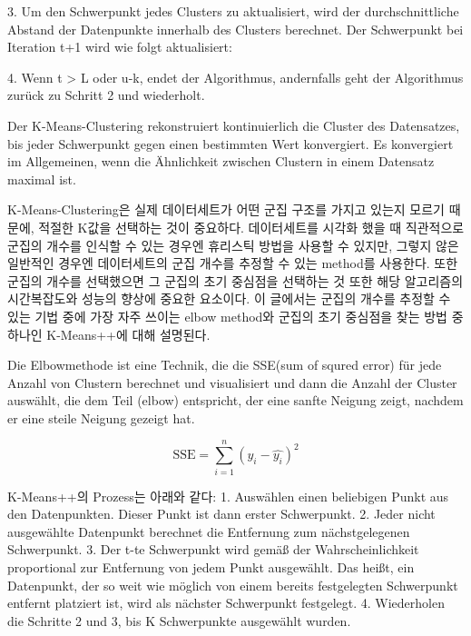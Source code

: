                     3. Um den Schwerpunkt jedes Clusters zu aktualisiert, wird der durchschnittliche Abstand der Datenpunkte innerhalb des Clusters berechnet. Der Schwerpunkt bei Iteration t+1 wird wie folgt aktualisiert:

                    4. Wenn t > L oder u-k, endet der Algorithmus, andernfalls geht der Algorithmus zurück zu Schritt 2 und wiederholt.
                

                Der K-Means-Clustering rekonstruiert kontinuierlich die Cluster des Datensatzes, bis jeder Schwerpunkt gegen einen bestimmten Wert konvergiert. Es konvergiert im Allgemeinen, wenn die Ähnlichkeit zwischen Clustern in einem Datensatz maximal ist.

                K-Means-Clustering은 실제 데이터세트가 어떤 군집 구조를 가지고 있는지 모르기 때문에, 적절한 K값을 선택하는 것이 중요하다. 데이터세트를 시각화 했을 때 직관적으로 군집의 개수를 인식할 수 있는 경우엔 휴리스틱 방법을 사용할 수 있지만, 그렇지 않은 일반적인 경우엔 데이터세트의 군집 개수를 추정할 수 있는 method를 사용한다. 또한 군집의 개수를 선택했으면 그 군집의 초기 중심점을 선택하는 것 또한 해당 알고리즘의 시간복잡도와 성능의 향상에 중요한 요소이다. 이 글에서는 군집의 개수를 추정할 수 있는 기법 중에 가장 자주 쓰이는 elbow method와 군집의 초기 중심점을 찾는 방법 중 하나인 K-Means++에 대해 설명된다.
                
                Die Elbowmethode ist eine Technik, die die SSE(sum of squred error) für jede Anzahl von Clustern berechnet und visualisiert und dann die Anzahl der Cluster auswählt, die dem Teil (elbow) entspricht, der eine sanfte Neigung zeigt, nachdem er eine steile Neigung gezeigt hat.

                
                \begin{equation}
                    \label{eqn:SSE}
                    \text{SSE}=\sum_{i=1}^{n}(y_i-\hat{y_i})^2    
                \end{equation}

                K-Means++의 Prozess는 아래와 같다:
                    1. Auswählen einen beliebigen Punkt aus den Datenpunkten. Dieser Punkt ist dann erster Schwerpunkt.
                    2. Jeder nicht ausgewählte Datenpunkt berechnet die Entfernung zum nächstgelegenen Schwerpunkt.
                    3. Der t-te Schwerpunkt wird gemäß der Wahrscheinlichkeit proportional zur Entfernung von jedem Punkt ausgewählt. Das heißt, ein Datenpunkt, der so weit wie möglich von einem bereits festgelegten Schwerpunkt entfernt platziert ist, wird als nächster Schwerpunkt festgelegt.
                    4. Wiederholen die Schritte 2 und 3, bis K Schwerpunkte ausgewählt wurden.

